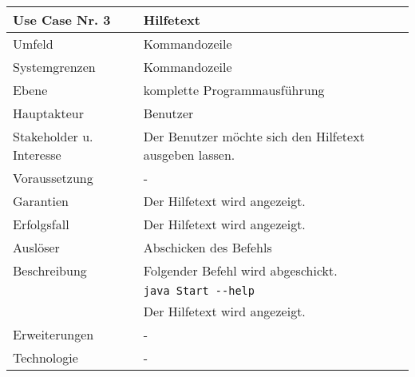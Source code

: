 \begin{tabular}{| l | l |}
 \hline
 \textbf{Use Case Nr. 3} & Hilfetext\\
 \hline
 Umfeld & Kommandozeile\\
 \hline
 Systemgrenzen & Kommandozeile\\
 \hline
 Ebene & komplette Programmausführung\\
 \hline
 Hauptakteur & Benutzer\\
 \hline
 Stakeholder u. Interesse & Der Benutzer möchte sich den Hilfetext ausgeben lassen.\\
 \hline
 Voraussetzung & -\\
 \hline
 Garantien & Der Hilfetext wird angezeigt.\\
 \hline
 Erfolgsfall & Der Hilfetext wird angezeigt.\\
 \hline
 Auslöser & Abschicken des Befehls\\
 \hline
 Beschreibung & Folgender Befehl wird abgeschickt.\\
	      & \verb|java Start --help|\\
	      & Der Hilfetext wird angezeigt.\\
 \hline
 Erweiterungen & -\\
 \hline
 Technologie & -\\
 \hline
\end{tabular}


